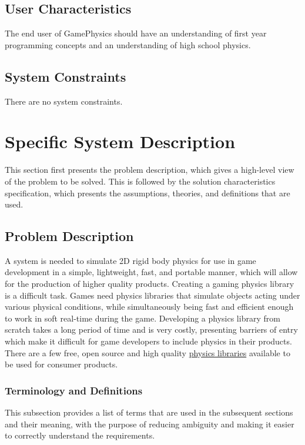 \documentclass[12pt]{article}
\begin{document}
\subsection{User Characteristics}
\label{Sec:UserChars}
The end user of GamePhysics should have an understanding of first year programming concepts and an understanding of high school physics.

\subsection{System Constraints}
\label{Sec:SysConstraints}
There are no system constraints.

\section{Specific System Description}
\label{Sec:SpecSystDesc}
This section first presents the problem description, which gives a high-level view of the problem to be solved. This is followed by the solution characteristics specification, which presents the assumptions, theories, and definitions that are used.

\subsection{Problem Description}
\label{Sec:ProbDesc}
A system is needed to simulate 2D rigid body physics for use in game development in a simple, lightweight, fast, and portable manner, which will allow for the production of higher quality products. Creating a gaming physics library is a difficult task. Games need physics libraries that simulate objects acting under various physical conditions, while simultaneously being fast and efficient enough to work in soft real-time during the game. Developing a physics library from scratch takes a long period of time and is very costly, presenting barriers of entry which make it difficult for game developers to include physics in their products. There are a few free, open source and high quality \hyperref[Sec:offShelfSolns]{physics libraries} available to be used for consumer products.

\subsubsection{Terminology and Definitions}
\label{Sec:TermDefs}
This subsection provides a list of terms that are used in the subsequent sections and their meaning, with the purpose of reducing ambiguity and making it easier to correctly understand the requirements.
\end{document}
